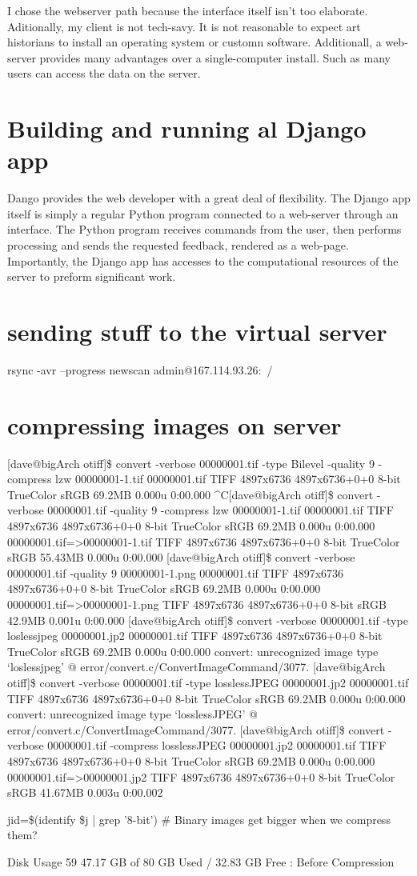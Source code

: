 I chose the webserver path because the interface itself isn't too elaborate.  Aditionally, my client is not tech-savy.  It is not reasonable to expect art historians to install an operating system or customn software.  Additionall, a web-server provides many advantages over a single-computer install.  Such as many users can access the data on the server.

\section{Building and running al Django app}

Dango provides the web developer with a great deal of flexibility.  The Django app itself is simply a regular Python program connected to a web-server through an interface.  The Python program receives commands from the user, then performs processing and sends the requested feedback, rendered as a web-page.  Importantly, the Django app has accesses to the computational resources of the server to preform significant work.

\section{sending stuff to the virtual server}


rsync -avr --progress newscan admin@167.114.93.26:~/



\section{compressing images on server}

[dave@bigArch otiff]\$ convert -verbose 00000001.tif -type Bilevel -quality 9 -compress lzw 00000001-1.tif 
00000001.tif TIFF 4897x6736 4897x6736+0+0 8-bit TrueColor sRGB 69.2MB 0.000u 0:00.000
^C[dave@bigArch otiff]\$ convert -verbose 00000001.tif -quality 9 -compress lzw 00000001-1.tif              
00000001.tif TIFF 4897x6736 4897x6736+0+0 8-bit TrueColor sRGB 69.2MB 0.000u 0:00.000
00000001.tif=>00000001-1.tif TIFF 4897x6736 4897x6736+0+0 8-bit TrueColor sRGB 55.43MB 0.000u 0:00.000
[dave@bigArch otiff]\$ convert -verbose 00000001.tif -quality 9 00000001-1.png
00000001.tif TIFF 4897x6736 4897x6736+0+0 8-bit TrueColor sRGB 69.2MB 0.000u 0:00.000
00000001.tif=>00000001-1.png TIFF 4897x6736 4897x6736+0+0 8-bit sRGB 42.9MB 0.001u 0:00.000
[dave@bigArch otiff]\$ convert -verbose 00000001.tif -type loslessjpeg 00000001.jp2
00000001.tif TIFF 4897x6736 4897x6736+0+0 8-bit TrueColor sRGB 69.2MB 0.000u 0:00.000
convert: unrecognized image type `loslessjpeg' @ error/convert.c/ConvertImageCommand/3077.
[dave@bigArch otiff]\$ convert -verbose 00000001.tif -type losslessJPEG 00000001.jp2
00000001.tif TIFF 4897x6736 4897x6736+0+0 8-bit TrueColor sRGB 69.2MB 0.000u 0:00.000
convert: unrecognized image type `losslessJPEG' @ error/convert.c/ConvertImageCommand/3077.
[dave@bigArch otiff]\$ convert -verbose 00000001.tif -compress losslessJPEG 00000001.jp2
00000001.tif TIFF 4897x6736 4897x6736+0+0 8-bit TrueColor sRGB 69.2MB 0.000u 0:00.000
00000001.tif=>00000001.jp2 TIFF 4897x6736 4897x6736+0+0 8-bit TrueColor sRGB 41.67MB 0.003u 0:00.002

jid=\$(identify \$j | grep '8-bit') # Binary images get bigger when we compress them?


Disk Usage      59%
47.17 GB of 80 GB Used / 32.83 GB Free : Before Compression

